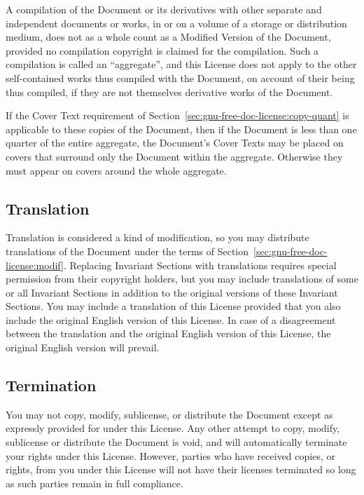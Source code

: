 \documentclass[11pt,a4paper,oneside]{article}
\begin{document}
A compilation of the Document or its derivatives with other separate and
independent documents or works, in or on a volume of a storage or
distribution medium, does not as a whole count as a Modified Version of
the Document, provided no compilation copyright is claimed for the
compilation.  Such a compilation is called an ``aggregate'', and this
License does not apply to the other self-contained works thus compiled
with the Document, on account of their being thus compiled, if they are
not themselves derivative works of the Document.

If the Cover Text requirement of
Section~\ref{sec:gnu-free-doc-license:copy-quant} is applicable to these
copies of the Document, then if the Document is less than one quarter of
the entire aggregate, the Document's Cover Texts may be placed on covers
that surround only the Document within the aggregate.  Otherwise they
must appear on covers around the whole aggregate.


\subsection{Translation}
\label{sec:gnu-free-doc-license:transl}

Translation is considered a kind of modification, so you may distribute
translations of the Document under the terms of
Section~\ref{sec:gnu-free-doc-license:modif}.  Replacing Invariant
Sections with translations requires special permission from their
copyright holders, but you may include translations of some or all
Invariant Sections in addition to the original versions of these
Invariant Sections.  You may include a translation of this License
provided that you also include the original English version of this
License.  In case of a disagreement between the translation and the
original English version of this License, the original English version
will prevail.


\subsection{Termination}
\label{sec:gnu-free-doc-license:term}

You may not copy, modify, sublicense, or distribute the Document except
as expressly provided for under this License.  Any other attempt to
copy, modify, sublicense or distribute the Document is void, and will
automatically terminate your rights under this License.  However,
parties who have received copies, or rights, from you under this License
will not have their licenses terminated so long as such parties remain
in full compliance.
\end{document}
